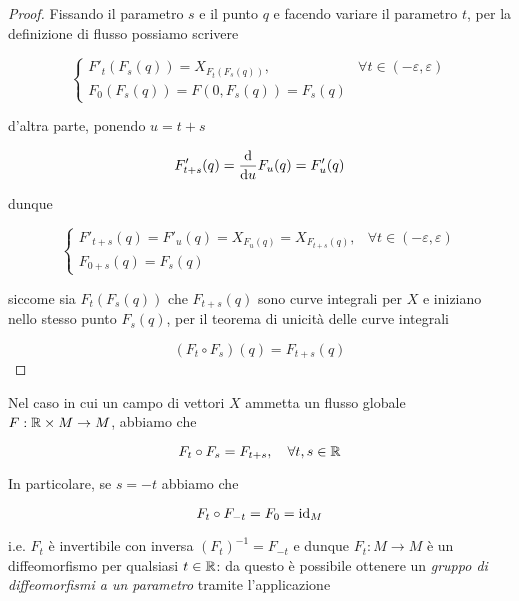 \begin{proof}
	Fissando il parametro $ s $ e il punto $ q $ e facendo variare il parametro $ t $, per la definizione di flusso possiamo scrivere
	
	\begin{equation}
		\begin{cases}
			F'_{t}(F_{s}(q)) = X_{F_{t}(F_{s}(q))}, & \forall t \in (-\varepsilon,\varepsilon) \\
			F_{0}(F_{s}(q)) = F(0,F_{s}(q)) = F_{s}(q)
		\end{cases}
	\end{equation}

	d'altra parte, ponendo $ u = t+s $
	
	\begin{equation}
		F'_{t+s}(q) = \dv{u} F_{u}(q) = F'_{u}(q)
	\end{equation}

	dunque
	
	\begin{equation}
		\begin{cases}
			F'_{t+s}(q) = F'_{u}(q) = X_{F_{u}(q)} = X_{F_{t+s}(q)}, & \forall t \in (-\varepsilon,\varepsilon) \\
			F_{0+s}(q) = F_{s}(q)
		\end{cases}
	\end{equation}

	siccome sia $ F_{t}(F_{s}(q)) $ che $ F_{t+s}(q) $ sono curve integrali per $ X $ e iniziano nello stesso punto $ F_{s}(q) $, per il teorema di unicità delle curve integrali
	
	\begin{equation}
		(F_{t} \circ F_{s})(q) = F_{t+s}(q)
	\end{equation}
\end{proof}

Nel caso in cui un campo di vettori $ X $ ammetta un flusso globale $ F : \mathbb{R} \times M \to M $, abbiamo che

\begin{equation}
	F_{t} \circ F_{s} = F_{t+s} \qcomma \forall t,s \in \R
\end{equation}

In particolare, se $ s = -t $ abbiamo che

\begin{equation}
	F_{t} \circ F_{-t} = F_{0} = \operatorname{id}_{M}
\end{equation}

i.e. $ F_{t} $ è invertibile con inversa $ (F_{t})^{-1} = F_{-t} $ e dunque $ F_{t} : M \to M $ è un diffeomorfismo per qualsiasi $ t \in \mathbb{R} $: da questo è possibile ottenere un \textit{gruppo di diffeomorfismi a un parametro} tramite l'applicazione

